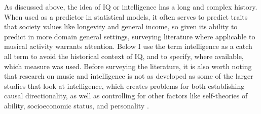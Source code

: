 \documentclass[12pt,]{book}
\begin{document}
As discussed above, the idea of IQ or intelligence has a long and complex history.
When used as a predictor in statistical models, it often serves to predict traits that society values like longevity and general income, so given its ability to predict in more domain general settings, surveying literature where applicable to musical activity warrants attention.
Below I use the term intelligence as a catch all term to avoid the historical context of IQ, and to specify, where available, which measure was used.
Before surveying the literature, it is also worth noting that research on music and intelligence is not as developed as some of the larger studies that look at intelligence, which creates problems for both establishing causal directionality, as well as controlling for other factors like self-theories of ability, socioeconomic status, and personality \citep{mullensiefenInvestigatingImportanceSelftheories2015}.
\end{document}
